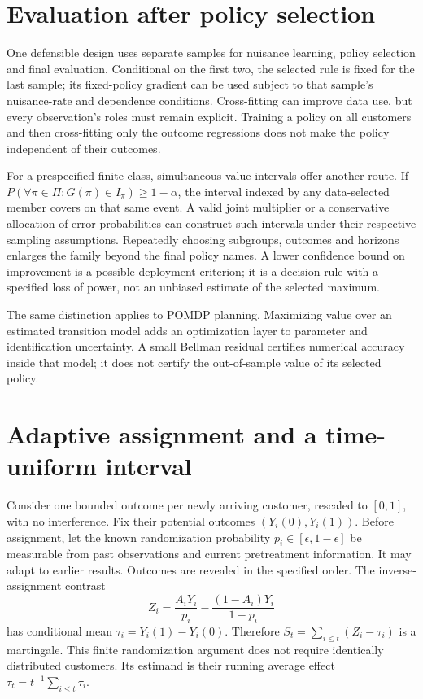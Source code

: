 \section{Evaluation after policy selection}
\label{r3:policy-selection}
One defensible design uses separate samples for nuisance learning,
policy selection and final evaluation. Conditional on the first two,
the selected rule is fixed for the last sample; its fixed-policy
gradient can be used subject to that sample's nuisance-rate and
dependence conditions. Cross-fitting can improve data use, but every
observation's roles must remain explicit. Training a policy on all
customers and then cross-fitting only the outcome regressions does
not make the policy independent of their outcomes.

For a prespecified finite class, simultaneous value intervals offer
another route. If $P(\forall\pi\in\Pi:G(\pi)\in I_\pi)\ge1-\alpha$,
the interval indexed by any data-selected member covers on that same
event. A valid joint multiplier or a conservative allocation of error
probabilities can construct such intervals under their respective
sampling assumptions. Repeatedly choosing subgroups, outcomes and
horizons enlarges the family beyond the final policy names. A lower
confidence bound on improvement is a possible deployment criterion;
it is a decision rule with a specified loss of power, not an unbiased
estimate of the selected maximum.

The same distinction applies to POMDP planning. Maximizing value over
an estimated transition model adds an optimization layer to parameter
and identification uncertainty. A small Bellman residual certifies
numerical accuracy inside that model; it does not certify the
out-of-sample value of its selected policy.

\section{Adaptive assignment and a time-uniform interval}
\label{r3:adaptive-inference}
Consider one bounded outcome per newly arriving customer, rescaled to
$[0,1]$, with no interference. Fix their potential outcomes
$(Y_i(0),Y_i(1))$. Before assignment, let the known randomization
probability $p_i\in[\epsilon,1-\epsilon]$ be measurable from past
observations and current pretreatment information. It may adapt to
earlier results. Outcomes are revealed in the specified order. The
inverse-assignment contrast
\[
 Z_i=\frac{A_iY_i}{p_i}-\frac{(1-A_i)Y_i}{1-p_i}
\]
has conditional mean $\tau_i=Y_i(1)-Y_i(0)$. Therefore
$S_t=\sum_{i\le t}(Z_i-\tau_i)$ is a martingale. This finite
randomization argument does not require identically distributed
customers. Its estimand is their running average effect
$\bar\tau_t=t^{-1}\sum_{i\le t}\tau_i$.

